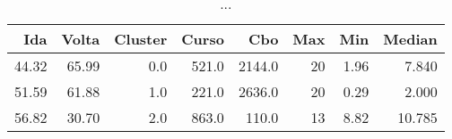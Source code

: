 \begin{table}
\centering
\caption{...}
\label{tab:Salarios_Desequlibrio_F}
\begin{tabular}{rrrrrrrr}
\toprule
  Ida &  Volta &  Cluster &  Curso &    Cbo &  Max &  Min &  Median \\
\midrule
44.32 &  65.99 &      0.0 &  521.0 & 2144.0 &   20 & 1.96 &   7.840 \\
51.59 &  61.88 &      1.0 &  221.0 & 2636.0 &   20 & 0.29 &   2.000 \\
56.82 &  30.70 &      2.0 &  863.0 &  110.0 &   13 & 8.82 &  10.785 \\
\bottomrule
\end{tabular}
\end{table}
